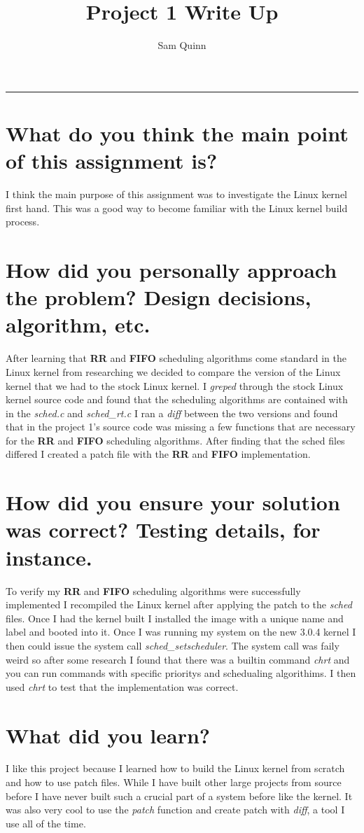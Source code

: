 \documentclass[letterpaper,10pt,notitlepage,fleqn]{article}
\title{Project 1 Write Up}
\author{Sam Quinn}
\begin{document}
\maketitle
\hrule

\section*{What do you think the main point of this assignment is?}
I think the main purpose of this assignment was to investigate the Linux kernel first hand. This was a 
good way to become familiar with the Linux kernel build process.
\section*{How did you personally approach the problem? Design decisions, algorithm, etc.}
After learning that \textbf{RR} and \textbf{FIFO} scheduling algorithms come standard in the Linux kernel 
from researching we decided to compare the version of the Linux kernel that we had to the stock Linux kernel. 
I \textit{greped} through the stock Linux kernel source code and found that the scheduling algorithms are 
contained with in the \textit{sched.c} and \textit{sched\_rt.c} I ran a \textit{diff} between the two versions and found that in 
the project 1's source code was missing a few functions that are necessary for the \textbf{RR} and \textbf{FIFO} scheduling 
algorithms. After finding that the sched files differed I created a patch file with the \textbf{RR} and \textbf{FIFO} implementation.

\section*{How did you ensure your solution was correct? Testing details, for instance.}
To verify my \textbf{RR} and \textbf{FIFO} scheduling algorithms were successfully implemented I recompiled the Linux kernel 
after applying the patch to the \textit{sched} files. Once I had the kernel built I installed the image with a unique name 
and label and booted into it. Once I was running my system on the new 3.0.4 kernel I then could issue the system call
\textit{sched\_setscheduler}. The system call was faily weird so after some research I found that there was a builtin command \textit{chrt} and you can run commands with specific prioritys and schedualing algorithims. I then used \textit{chrt} to test that the implementation was correct.
\section*{What did you learn?}
I like this project because I learned how to build the Linux kernel from scratch and how to use patch files. While 
I have built other large projects from source before I have never built such a crucial part of a system before like 
the kernel. It was also very cool to use the \textit{patch} function and create patch with \textit{diff}, a tool I use all of the time.
\end{document}
